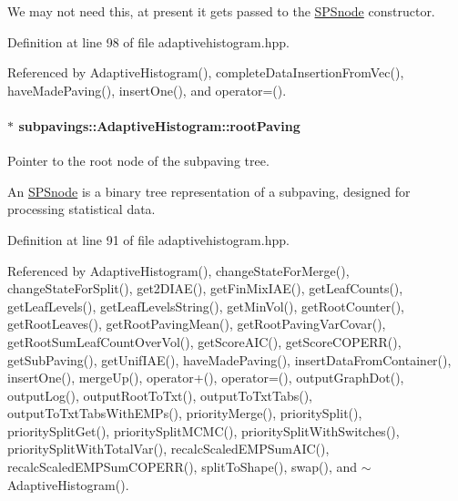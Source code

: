 \-We may not need this, at present it gets passed to the \hyperlink{classsubpavings_1_1SPSnode}{\-S\-P\-Snode} constructor. 

\-Definition at line 98 of file adaptivehistogram.\-hpp.



\-Referenced by \-Adaptive\-Histogram(), complete\-Data\-Insertion\-From\-Vec(), have\-Made\-Paving(), insert\-One(), and operator=().

\hypertarget{classsubpavings_1_1AdaptiveHistogram_a88a104768020c02deb2a7df9e2b4cb3a}{
\paragraph[{root\-Paving}]{$\ast$ {\bf subpavings\-::\-Adaptive\-Histogram\-::root\-Paving}}}\label{classsubpavings_1_1AdaptiveHistogram_a88a104768020c02deb2a7df9e2b4cb3a}


\-Pointer to the root node of the subpaving tree. 

\-An \hyperlink{classsubpavings_1_1SPSnode}{\-S\-P\-Snode} is a binary tree representation of a subpaving, designed for processing statistical data. 

\-Definition at line 91 of file adaptivehistogram.\-hpp.



\-Referenced by \-Adaptive\-Histogram(), change\-State\-For\-Merge(), change\-State\-For\-Split(), get2\-D\-I\-A\-E(), get\-Fin\-Mix\-I\-A\-E(), get\-Leaf\-Counts(), get\-Leaf\-Levels(), get\-Leaf\-Levels\-String(), get\-Min\-Vol(), get\-Root\-Counter(), get\-Root\-Leaves(), get\-Root\-Paving\-Mean(), get\-Root\-Paving\-Var\-Covar(), get\-Root\-Sum\-Leaf\-Count\-Over\-Vol(), get\-Score\-A\-I\-C(), get\-Score\-C\-O\-P\-E\-R\-R(), get\-Sub\-Paving(), get\-Unif\-I\-A\-E(), have\-Made\-Paving(), insert\-Data\-From\-Container(), insert\-One(), merge\-Up(), operator+(), operator=(), output\-Graph\-Dot(), output\-Log(), output\-Root\-To\-Txt(), output\-To\-Txt\-Tabs(), output\-To\-Txt\-Tabs\-With\-E\-M\-Ps(), priority\-Merge(), priority\-Split(), priority\-Split\-Get(), priority\-Split\-M\-C\-M\-C(), priority\-Split\-With\-Switches(), priority\-Split\-With\-Total\-Var(), recalc\-Scaled\-E\-M\-P\-Sum\-A\-I\-C(), recalc\-Scaled\-E\-M\-P\-Sum\-C\-O\-P\-E\-R\-R(), split\-To\-Shape(), swap(), and $\sim$\-Adaptive\-Histogram().

